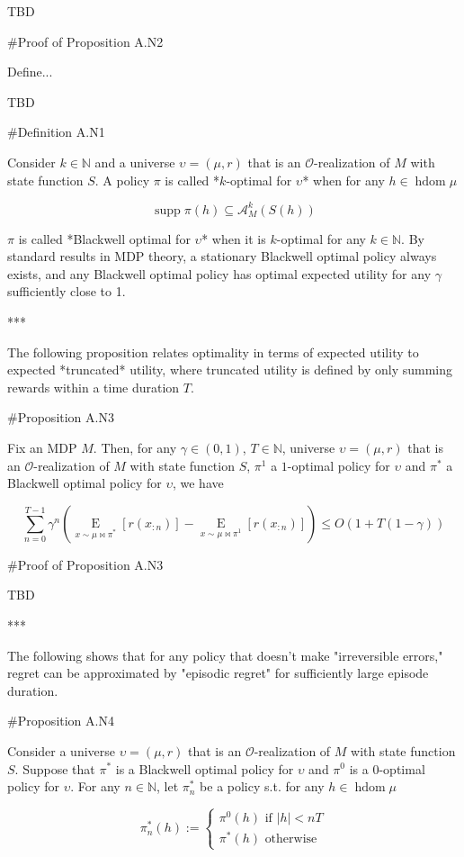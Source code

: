 \documentclass[a4paper]{article}
\DeclareMathOperator{\Supp}{supp}
\newcommand{\E}[1]{\underset{#1}{\operatorname{E}}}
\newcommand{\Nats}{\mathbb{N}}
\newcommand{\Abs}[1]{\lvert #1 \rvert}
\newcommand{\Ob}{\mathcal{O}}
\newcommand{\A}{\mathcal{A}}
\DeclareMathOperator{\HD}{hdom}
\begin{document}
TBD

\#Proof of Proposition A.N2

Define...

TBD

\#Definition A.N1

Consider $k \in \Nats$ and a universe $\upsilon=(\mu,r)$ that is an $\Ob$-realization of $M$ with state function $S$. A policy $\pi$ is called *$k$-optimal for $\upsilon$* when for any $h \in \HD{\mu}$

$$\Supp \pi(h) \subseteq \A_M^k\left(S(h)\right)$$

$\pi$ is called *Blackwell optimal for $\upsilon$* when it is $k$-optimal for any $k \in \Nats$. By standard results in MDP theory, a stationary Blackwell optimal policy always exists, and any Blackwell optimal policy has optimal expected utility for any $\gamma$ sufficiently close to 1.

***

The following proposition relates optimality in terms of expected utility to expected *truncated* utility, where truncated utility is defined by only summing rewards within a time duration $T$.

\#Proposition A.N3

Fix an MDP $M$. Then, for any $\gamma\in(0,1)$, $T \in \Nats$, universe $\upsilon=(\mu,r)$ that is an $\Ob$-realization of $M$ with state function $S$, $\pi^1$ a $1$-optimal policy for $\upsilon$ and $\pi^*$ a Blackwell optimal policy for $\upsilon$, we have

$$\sum_{n=0}^{T-1} \gamma^n \left(\E{x \sim \mu\bowtie\pi^*}\left[r\left(x_{:n}\right)\right]-\E{x \sim \mu\bowtie\pi^1}\left[r\left(x_{:n}\right)\right]\right) \leq O\left(1+T\left(1-\gamma\right)\right)$$

\#Proof of Proposition A.N3

TBD

***

The following shows that for any policy that doesn't make "irreversible errors," regret can be approximated by "episodic regret" for sufficiently large episode duration.

\#Proposition A.N4

Consider a universe $\upsilon=(\mu,r)$ that is an $\Ob$-realization of $M$ with state function $S$. Suppose that $\pi^*$ is a Blackwell optimal policy for $\upsilon$ and $\pi^0$ is a $0$-optimal policy for $\upsilon$. For any $n \in \Nats$, let $\pi^*_n$ be a policy s.t. for any $h \in \HD{\mu}$

$$\pi^*_n(h):=\begin{cases} \pi^0(h) \text{ if } \Abs{h} < nT \\ \pi^*(h) \text{ otherwise} \end{cases}$$
\end{document}
